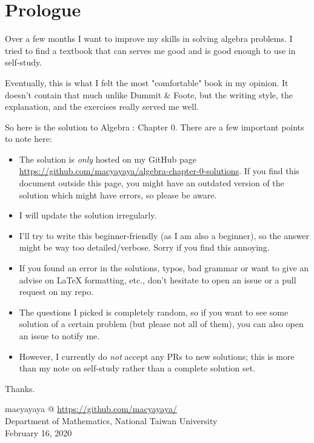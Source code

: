 \thispagestyle{empty}
\begin{center}
\end{center}
    
\newpage

\chapter{Prologue}
Over a few months I want to improve my skills in solving algebra problems. I tried to find a textbook that can serves me good and is good enough to use in self-study. 

Eventually, this is what I felt the most "comfortable" book in my opinion. It doesn't contain that much unlike Dummit \& Foote, but the writing style, the explanation, and the exercises really served me well.

So here is the solution to Algebra : Chapter 0. There are a few important points to note here:
\begin{itemize}
    \item The solution is \emph{only} hosted on my GitHub page \href{https://github.com/macyayaya/algebra-chapter-0-solutions}{https://github.com/macyayaya/algebra-chapter-0-solutions}. If you find this document outside this page, you might have an outdated version of the solution which might have errors, so please be aware.
    \item I will update the solution irregularly.
    \item I'll try to write this beginner-friendly (as I am also a beginner), so the answer might be way too detailed/verbose. Sorry if you find this annoying. 
    \item If you found an error in the solutions, typos, bad grammar or want to give an advise on LaTeX formatting, etc., don't hesitate to open an issue or a pull request on my repo. 
    \item The questions I picked is completely random, so if you want to see some solution of a certain problem (but please not all of them), you can also open an issue to notify me. 
    \item However, I currently do \emph{not} accept any PRs to new solutions; this is more than my note on self-study rather than a complete solution set.
\end{itemize}

Thanks. 

\begin{flushright}
macyayaya @ \href{https://github.com/macyayaya/}{https://github.com/macyayaya/} \\
Department of Mathematics, National Taiwan University \\
February 16, 2020
\end{flushright}
